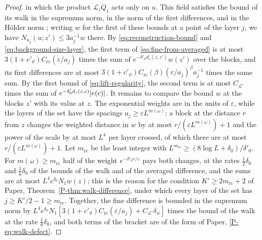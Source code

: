 \documentclass[11pt]{preprint}
\DeclarePairedDelimiter{\abs}{\lvert}{\rvert}
\numberwithin{equation}{section}
\theoremstyle{definition}
\theoremstyle{remark}
\theoremstyle{plain}
\begin{document}
\begin{proof}
in which the product $\mathcal L_\iota Q_1$ acts only on $u$. This field satisfies the bound of its walk in the supremum norm, in the norm of the first differences, and in the H\"older norm \cite[(3.107), (3.108), p.~416]{BalabanPBG}; writing $w$ for the first of these bounds at a point of the layer $j$, we have $N_{a_j}(u; z') \leq 3a_j^{-1}w$ there. By \eqref{eq:reconstruction-bound} and \eqref{eq:background-size-layer}, the first term of \eqref{eq:fine-from-averaged} is at most $3(1 + c'_\vartheta)C_{\mathrm{rc}}(\varepsilon/a_j)$ times the sum of $e^{-\delta'_0d_\varepsilon(z,z')}w(z')$ over the blocks, and its first differences are at most $3(1 + c'_\vartheta)C_{\mathrm{rc}}(\beta)(\varepsilon/a_j)^\beta a_j^{-1}$ times the same sum. By the first bound of \eqref{eq:lift-regularity}, the second term is at most $C_{\mathcal L'}$ times the sum of $e^{-\delta'_0d_\varepsilon(z,c)}\abs{e(c)}$. It remains to compare the bound $w$ at the blocks $z'$ with its value at $z$. The exponential weights are in the units of $\varepsilon$, while the layers of the set have the spacings $a_j \geq \varepsilon L^{m(\omega)}$: a block at the distance $r$ from $z$ changes the weighted distance in $w$ by at most $r/(\varepsilon L^{m(\omega)}) + 1$ and the power of the scale by at most $L^4$ per layer crossed, of which there are at most $r/(\varepsilon L^{m(\omega)}) + 1$. Let $m_{\mathrm{rc}}$ be the least integer with $L^{m_{\mathrm{rc}}} \geq (8\log L + \delta_0)/\delta'_0$. For $m(\omega) \geq m_{\mathrm{rc}}$ half of the weight $e^{-\delta'_0r/\varepsilon}$ pays both changes, at the rates $\frac12\delta_0$ and $\frac16\delta_0$ of the bounds of the walk and of the averaged difference, and the sums are at most $L^4e^{\delta_0}N_1w(z)$; this is the reason for the condition $K' \geq 2m_{\mathrm{rc}} + 2$ of Paper, Theorem~\ref{P-thm:walk-difference}, under which every layer of the set has $j \geq K'/2 - 1 \geq m_{\mathrm{rc}}$. Together, the fine difference is bounded in the supremum norm by $L^4e^{\delta_0}N_1[3(1 + c'_\vartheta)C_{\mathrm{rc}}(\varepsilon/a_j) + C_{\mathcal L'}\delta_w]$ times the bound of the walk at the rate $\frac16\delta_0$, and both terms of the bracket are of the form of Paper, \eqref{P-eq:walk-defect}.


\end{proof}
\end{document}

